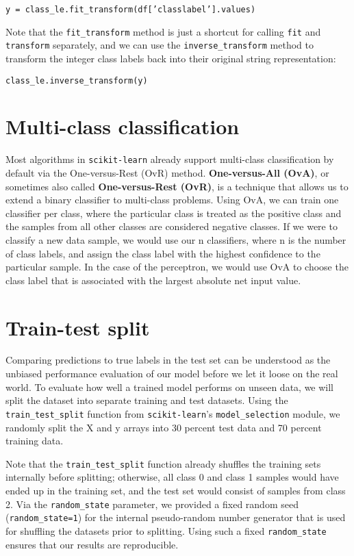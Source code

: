 \documentclass[11pt]{article}
\begin{document}
    \texttt{y = class\_le.fit\_transform(df['classlabel'].values)}

    Note that the \texttt{fit\_transform} method is just a shortcut for calling \texttt{fit} and \texttt{transform} separately, and we can use the \texttt{inverse\_transform} method to transform the integer class labels back into their original string representation:

    \texttt{class\_le.inverse\_transform(y)}

    \section{Multi-class classification} \label{sec:multiclass_classification}

    Most algorithms in \texttt{scikit-learn} already support multi-class classification by default via the One-versus-Rest (OvR) method. \textbf{One-versus-All (OvA)}, or sometimes also called \textbf{One-versus-Rest (OvR)}, is a technique that allows us to extend a binary classifier to multi-class problems.
    Using OvA, we can train one classifier per class, where the particular class is treated as the positive class and the samples from all other classes are considered negative classes.
    If we were to classify a new data sample, we would use our n classifiers, where n is the number of class labels, and assign the class label with the highest confidence to the particular sample.
    In the case of the perceptron, we would use OvA to choose the class label that is associated with the largest absolute net input value.

    \section{Train-test split} \label{sec:train_test_split}

    Comparing predictions to true labels in the test set can be understood as the unbiased performance evaluation of our model before we let it loose on the real world.
    To evaluate how well a trained model performs on unseen data, we will split the dataset into separate training and test datasets.
    Using the \texttt{train\_test\_split} function from \texttt{scikit-learn}'s \texttt{model\_selection} module, we randomly split the X and y arrays into 30 percent test data and 70 percent training data.

    Note that the \texttt{train\_test\_split} function already shuffles the training sets internally before splitting;
    otherwise, all class 0 and class 1 samples would have ended up in the training set, and the test set would consist of samples from class 2.
    Via the \texttt{random\_state} parameter, we provided a fixed random seed (\texttt{random\_state=1}) for the internal pseudo-random number generator that is used for shuffling the datasets prior to splitting.
    Using such a fixed \texttt{random\_state} ensures that our results are reproducible.
\end{document}
